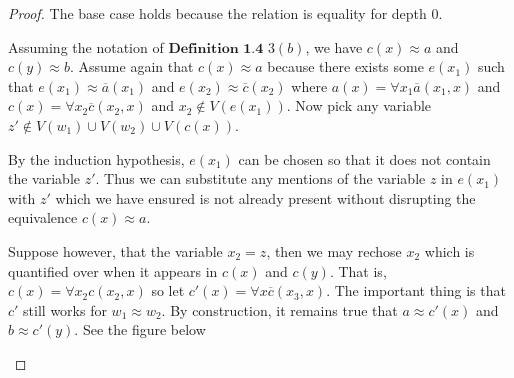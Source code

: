 \documentclass{article}
\theoremstyle{problemstyle}
\theoremstyle{lemmastyle}
\theoremstyle{theoremstyle}
\begin{document}
\begin{proof}
The base case holds because the relation is equality for depth $0$. 

Assuming the notation of $\textbf{Definition 1.4}$ $3 (b)$, we have $c(x) \approx a$ and $c(y) \approx b$.  Assume again that $c(x) \approx a$ because there exists some $e(x_1)$ such that $e(x_1) \approx \overline{a}(x_1)$ and $e(x_2) \approx \overline{c}(x_2)$ where $a(x) = \forall x_1 \overline{a}(x_1,x)$ and $c(x) = \forall x_2 \overline{c}(x_2,x)$ and $x_2 \notin V(e(x_1))$. Now pick any variable $z' \notin V(w_1) \cup V(w_2)\cup V(c(x))$. 

By the induction hypothesis, $e(x_1)$ can be chosen so that it does not contain the variable $z'$. Thus we can substitute any mentions of the variable $z$ in $e(x_1)$ with $z'$ which we have ensured is not already present without disrupting the equivalence $c(x) \approx a$.  

Suppose however, that the variable $x_2 = z$, then we may rechose $x_2$ which is quantified over when it appears in $c(x)$ and $c(y)$. That is, $c(x) = \forall x_2c(x_2,x)$ so let $c'(x) = \forall x\overline{c}(x_3,x)$. The important thing is that $c'$ still works for $w_1 \approx w_2$. By construction, it remains true that $a \approx c'(x)$ and $b \approx c'(y)$. See the figure below

\begin{flushleft}
\end{flushleft}
\end{proof}
\end{document}
